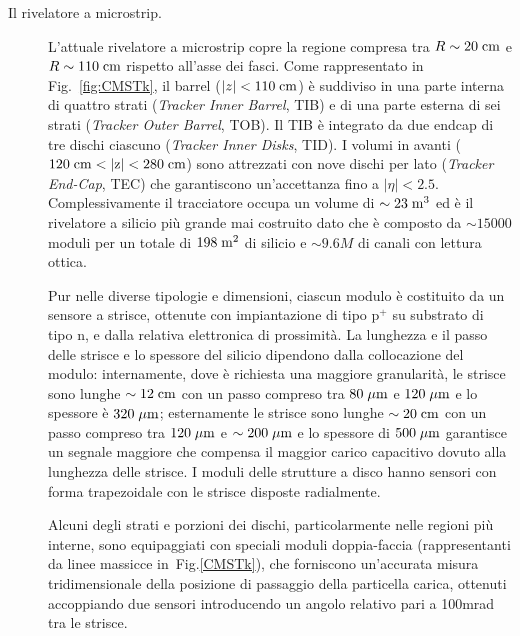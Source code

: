 \begin{description}
\item[Il rivelatore a microstrip.] L'attuale rivelatore a microstrip copre la regione compresa tra $R\sim 20\rm \; cm$ e $R\sim 110\rm \; cm$ rispetto all'asse dei fasci. Come rappresentato in Fig.~\ref{fig:CMSTk}, il barrel ($|z|<110\rm \; cm$) \`e suddiviso in una parte interna di quattro strati ({\em Tracker Inner Barrel}, TIB) e di una parte esterna di sei strati ({\em Tracker Outer Barrel}, TOB). Il TIB \`e integrato da due endcap di tre dischi ciascuno ({\em Tracker Inner Disks}, TID). I volumi in avanti ($120\rm \; cm < |z| < 280\rm \; cm$) sono attrezzati con nove dischi per lato ({\em Tracker End-Cap}, TEC) che garantiscono un'accettanza fino a $|\eta|<2.5$. Complessivamente il tracciatore occupa un volume di $\sim 23\rm \; m^3$ ed \`e il rivelatore a silicio pi\`u grande mai costruito dato che \`e composto da $\sim 15000$ moduli per un totale di $198\rm \; m^2$ di silicio e $\sim 9.6M$ di canali con lettura ottica.

Pur nelle diverse tipologie e dimensioni, ciascun modulo \`e costituito da un sensore a strisce, ottenute con impiantazione di tipo p$^+$ su substrato di tipo n, e dalla relativa elettronica di prossimit\`a. La lunghezza e il passo delle strisce e lo spessore del silicio dipendono dalla collocazione del modulo: internamente, dove \`e richiesta una maggiore granularit\`a, le strisce sono lunghe $\sim 12\rm \; cm$ con un passo compreso tra $80\; \mu \rm m$ e $120\; \mu \rm m$ e lo spessore \`e $320\; \mu \rm m$; esternamente le strisce sono lunghe $\sim 20\rm \; cm$ con un passo compreso tra $120\; \mu \rm m$ e $\sim 200\; \mu \rm m$ e lo spessore di $500\; \mu \rm m$ garantisce un segnale maggiore che compensa il maggior carico capacitivo dovuto alla lunghezza delle strisce. I moduli delle strutture a disco hanno sensori con forma trapezoidale con le strisce disposte radialmente.

Alcuni degli strati e porzioni dei dischi, particolarmente nelle regioni pi\`u interne, sono equipaggiati con speciali moduli doppia-faccia (rappresentanti da linee massicce in~Fig.\ref{CMSTk}), che forniscono un'accurata misura tridimensionale della posizione di passaggio della particella carica, ottenuti accoppiando due sensori introducendo un angolo relativo pari a 100mrad tra le strisce. 
\end{description}

